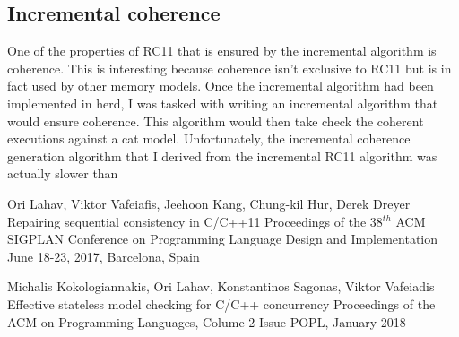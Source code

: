 \documentclass[a4,11pt,dvipsnames]{article}
\begin{document}
\subsection{Incremental coherence}

One of the properties of RC11 that is ensured by the incremental algorithm is coherence. This is interesting because coherence isn't exclusive to RC11 but is in fact used by other memory models. Once the incremental algorithm had been implemented in herd, I was tasked with writing an incremental algorithm that would ensure coherence. This algorithm would then take check the coherent executions against a cat model. Unfortunately, the incremental coherence generation algorithm that I derived from the incremental RC11 algorithm was actually slower than 

\begin{thebibliography}{9}

	Ori Lahav, Viktor Vafeiafis, Jeehoon Kang, Chung-kil Hur, Derek Dreyer
	Repairing sequential consistency in C/C++11
	Proceedings of the 38$^{th}$ ACM SIGPLAN Conference on Programming Language Design and Implementation
	June 18-23, 2017, Barcelona, Spain

	Michalis Kokologiannakis, Ori Lahav, Konstantinos Sagonas, Viktor Vafeiadis
	Effective stateless model checking for C/C++ concurrency
	Proceedings of the ACM on Programming Languages, Colume 2 Issue POPL,
	January 2018
\end{thebibliography}
\end{document}
